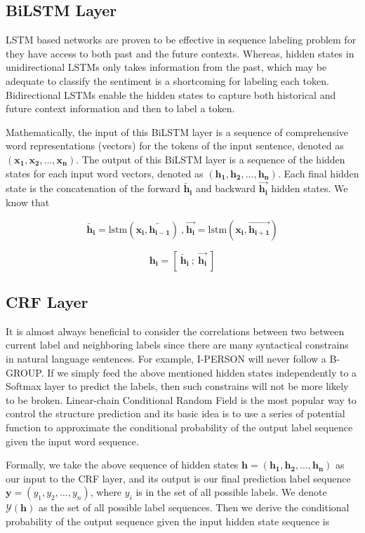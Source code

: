 \subsection{BiLSTM Layer}
LSTM based networks are proven to be effective in sequence labeling problem for they have access to both past and the future contexts. 
Whereas, hidden states in unidirectional LSTMs only takes information from the past, which may be adequate to classify the sentiment  is a shortcoming for labeling each token.
Bidirectional LSTMs enable the hidden states to capture both historical and future context information and then to label a token.

Mathematically, the input of this BiLSTM layer is a sequence of comprehensive word representations (vectors) for the tokens of the input sentence,  denoted as 
$( \mathbf{x_1}, \mathbf{x_2},...,\mathbf{x_n})$. 
The output of this BiLSTM layer is a sequence of the hidden states for each input word vectors, denoted as 
$( \mathbf{h_1}, \mathbf{h_2},...,\mathbf{h_n})$. 
Each final hidden state is the concatenation of the forward $\overleftarrow{\mathbf{h_i}}$ and backward $\overrightarrow{\mathbf{h_i}}$ hidden states.
We know that 

$$\overleftarrow{\mathbf{h_i}}= \text{lstm}(\mathbf{x_i}, \overleftarrow{\mathbf{h_{i-1}}})~\text{,}~\overrightarrow{\mathbf{h_i}}= \text{lstm}(\mathbf{x_i}, \overrightarrow{\mathbf{h_{i+1}}})$$ 

$$\mathbf{h_i} = \left[~\overleftarrow{\mathbf{h_i}}~;~\overrightarrow{\mathbf{h_i}}~\right]$$


\subsection{CRF Layer}
It is almost always beneficial to consider the correlations between two between current label and neighboring labels since there are many syntactical constrains in natural language sentences. 
For example, I-PERSON will never follow a B-GROUP. 
If we simply feed the above mentioned hidden states independently to a Softmax layer to predict the labels, then such constrains will not be more likely to be broken. 
Linear-chain Conditional Random Field is the most popular way to control the structure prediction and its basic idea is to use a series of potential function to approximate the conditional probability of the output label sequence given the input word sequence. 

Formally, we take the above sequence of hidden states  $ \mathbf{h} = ( \mathbf{h_1}, \mathbf{h_2},...,\mathbf{h_n})$ as our input to the CRF layer, and its output is our final prediction label sequence $\mathbf{y} = ( {y_1}, {y_2},...,{y_n})$, where $y_i$ is in the set of all possible labels. 
We denote $\mathcal{Y}(\mathbf{h})$ as the set of all possible label sequences.
Then we derive the conditional probability of the output sequence given the input hidden state sequence is 

